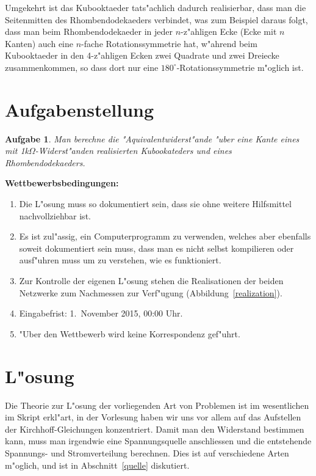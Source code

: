 \documentclass[a4paper,12pt]{article}
\begin{document}
Umgekehrt ist das Kubooktaeder tats"achlich dadurch realisierbar, dass
man die Seitenmitten des Rhombendodekaeders verbindet, was zum Beispiel
daraus folgt, dass man beim Rhombendodekaeder in jeder $n$-z"ahligen
Ecke (Ecke mit $n$ Kanten) auch eine $n$-fache Rotationssymmetrie hat,
w"ahrend beim Kubooktaeder in den 4-z"ahligen Ecken zwei Quadrate
und zwei Dreiecke zusammenkommen, so dass dort nur eine
$180^\circ$-Rotationssymmetrie m"oglich ist.

\section{Aufgabenstellung}

\newtheorem{aufgabe}{Aufgabe}
\begin{aufgabe}
Man berechne die "Aquivalentwiderst"ande "uber eine Kante eines mit
1k$\Omega$-Widerst"anden realisierten Kubookateders und eines
Rhombendodekaeders.
\end{aufgabe}

{\parindent0pt \bf Wettbewerbsbedingungen:}
\begin{enumerate}
\item
Die L"osung muss so dokumentiert sein, dass sie ohne weitere Hilfsmittel
nachvollziehbar ist.
\item
Es ist zul"assig, ein Computerprogramm zu verwenden, welches aber ebenfalls
soweit dokumentiert sein muss, dass man es nicht selbst kompilieren oder
ausf"uhren muss um zu verstehen, wie es funktioniert.
\item
Zur Kontrolle der eigenen L"osung stehen die Realisationen der beiden
Netzwerke zum Nachmessen zur Verf"ugung (Abbildung~\ref{realization}).
\item
Eingabefrist: 1.~November 2015, 00:00 Uhr.
\item
"Uber den Wettbewerb wird keine Korrespondenz gef"uhrt.
\end{enumerate}

\section{L"osung}
Die Theorie zur L"osung der vorliegenden Art von Problemen ist
im wesentlichen im Skript erkl"art, in der Vorlesung haben wir
uns vor allem auf das Aufstellen der Kirchhoff-Gleichungen 
konzentriert.
Damit man den Widerstand bestimmen kann, muss man irgendwie eine
Spannungsquelle anschliessen und die entstehende Spannungs- und Stromverteilung
berechnen.
Dies ist auf verschiedene Arten m"oglich, und ist in Abschnitt~\ref{quelle}
diskutiert.
\end{document}
